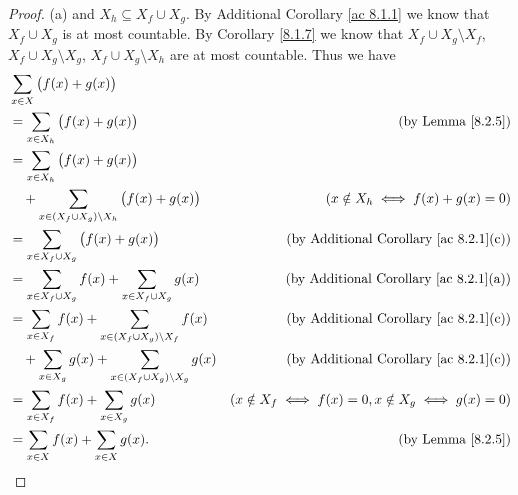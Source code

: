 \begin{proof}{(a)}
    and \(X_h \subseteq X_f \cup X_g\).
    By Additional Corollary \ref{ac 8.1.1} we know that \(X_f \cup X_g\) is at most countable.
    By Corollary \ref{8.1.7} we know that \(X_f \cup X_g \setminus X_f\), \(X_f \cup X_g \setminus X_g\), \(X_f \cup X_g \setminus X_h\) are at most countable.
    Thus we have
    \begin{align*}
         & \sum_{x \in X} \big(f(x) + g(x)\big)                                                                                                      \\
         & = \sum_{x \in X_h} \big(f(x) + g(x)\big)                                       & \text{(by Lemma \ref{8.2.5})}                            \\
         & = \sum_{x \in X_h} \big(f(x) + g(x)\big)                                                                                                  \\
         & \quad + \sum_{x \in (X_f \cup X_g) \setminus X_h} \big(f(x) + g(x)\big)        & (x \notin X_h \iff f(x) + g(x) = 0)                      \\
         & = \sum_{x \in X_f \cup X_g} \big(f(x) + g(x)\big)                              & \text{(by Additional Corollary \ref{ac 8.2.1}(c))}       \\
         & = \sum_{x \in X_f \cup X_g} f(x) + \sum_{x \in X_f \cup X_g} g(x)              & \text{(by Additional Corollary \ref{ac 8.2.1}(a))}       \\
         & = \sum_{x \in X_f} f(x) + \sum_{x \in (X_f \cup X_g) \setminus X_f} f(x)       & \text{(by Additional Corollary \ref{ac 8.2.1}(c))}       \\
         & \quad + \sum_{x \in X_g} g(x) + \sum_{x \in (X_f \cup X_g) \setminus X_g} g(x) & \text{(by Additional Corollary \ref{ac 8.2.1}(c))}       \\
         & = \sum_{x \in X_f} f(x) + \sum_{x \in X_g} g(x)                                & (x \notin X_f \iff f(x) = 0, x \notin X_g \iff g(x) = 0) \\
         & = \sum_{x \in X} f(x) + \sum_{x \in X} g(x).                                   & \text{(by Lemma \ref{8.2.5})}
    \end{align*}
\end{proof}

